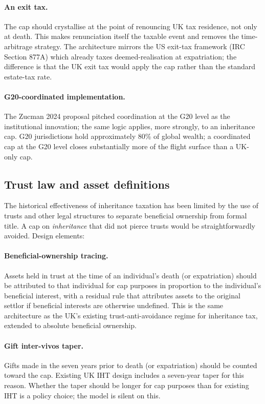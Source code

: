\documentclass[11pt]{article}
\begin{document}
\paragraph{An exit tax.}  The cap should crystallise at the point of
renouncing UK tax residence, not only at death.  This makes
renunciation itself the taxable event and removes the time-arbitrage
strategy.  The architecture mirrors the US exit-tax framework
(IRC Section 877A) which already taxes deemed-realisation at
expatriation; the difference is that the UK exit tax would apply
the cap rather than the standard estate-tax rate.

\paragraph{G20-coordinated implementation.}  The Zucman 2024
proposal pitched coordination at the G20 level as the
institutional innovation; the same logic applies, more strongly, to
an inheritance cap.  G20 jurisdictions hold approximately 80\%
of global wealth; a coordinated cap at the G20 level closes
substantially more of the flight surface than a UK-only cap.

\subsection{Trust law and asset definitions}

The historical effectiveness of inheritance taxation has been limited
by the use of trusts and other legal structures to separate beneficial
ownership from formal title.  A cap on \emph{inheritance} that did not
pierce trusts would be straightforwardly avoided.  Design elements:

\paragraph{Beneficial-ownership tracing.}  Assets held in trust at
the time of an individual's death (or expatriation) should be
attributed to that individual for cap purposes in proportion to
the individual's beneficial interest, with a residual rule that
attributes assets to the original settlor if beneficial interests
are otherwise undefined.  This is the same architecture as the
UK's existing trust-anti-avoidance regime for inheritance tax,
extended to absolute beneficial ownership.

\paragraph{Gift inter-vivos taper.}  Gifts made in the seven years
prior to death (or expatriation) should be counted toward the cap.
Existing UK IHT design includes a seven-year taper for this reason.
Whether the taper should be longer for cap purposes than for
existing IHT is a policy choice; the model is silent on this.
\end{document}
